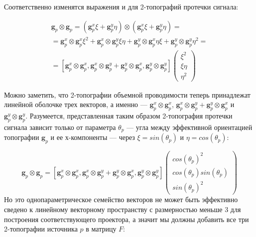 Соответственно изменятся выражения и для 2-топографий протечки сигнала:

\begin{gather}
    \mathbf{g}_p \otimes \mathbf{g}_p = (\mathbf{g}_p^x \xi
                                      + \mathbf{g}_p^y \eta) \otimes (\mathbf{g}_p^x \xi
                                      + \mathbf{g}_p^y \eta) = \nonumber \\
                                      = \mathbf{g}_p^x \otimes \mathbf{g}_p^x \xi^2
                                      + \mathbf{g}_p^x \otimes \mathbf{g}_p^y \xi \eta
                                      + \mathbf{g}_p^y\otimes  \mathbf{g}_p^x \eta \xi
                                      + \mathbf{g}_p^y \otimes \mathbf{g}_p^y \eta^2 = \nonumber \\
                                      = [\mathbf{g}_p^x \otimes \mathbf{g}_p^x,
                                         \mathbf{g}_p^x \otimes \mathbf{g}_p^y
                                      + \mathbf{g}_p^y \otimes \mathbf{g}_p^x,
                                        \mathbf{g}_p^y \otimes \mathbf{g}_p^y]
\left( \begin{array}{ccc}
\xi^2 \\
\xi \eta \\
\eta^2
\end{array}
\right)
\end{gather}

Можно заметить, что 2-топографии объемной проводимости теперь принадлежат линейной оболочке трех векторов,
а именно --- $\mathbf{g}_p^x \otimes \mathbf{g}_p^x$, $\mathbf{g}_p^x \otimes \mathbf{g}_p^y + \mathbf{g}_p^y \otimes \mathbf{g}_p^x$ и $\mathbf{g}_p^y \otimes \mathbf{g}_p^y$.
Разумеется, представленная таким образом 2-топография протечки сигнала зависит только от параметра $\theta_p$ --- угла
между эффективной ориентацией топографии $\mathbf{g}_p$ и ее $х$-компоненты --- через $\xi = sin(\theta_p)$ и $\eta=cos(\theta_p)$:

\begin{equation*}
    \mathbf{g}_p \otimes \mathbf{g}_p =[\mathbf{g}_p^x \otimes \mathbf{g}_p^x, \mathbf{g}_p^x \otimes \mathbf{g}_p^y + \mathbf{g}_p^y \otimes \mathbf{g}_p^x, \mathbf{g}_p^y \otimes \mathbf{g}_p^y]
    \left( \begin{array}{ccc}
    cos(\theta_p)^2 \\
    cos(\theta_p) sin(\theta_p) \\
    sin(\theta_p)^2
    \end{array}
    \right)
\end{equation*}
Но это однопараметрическое семейство векторов не может быть эффективно сведено к линейному векторному
пространству с размерностью меньше 3 для построения соответствующего проектора,
а значит мы должны добавить все три 2-топографии источника $p$ в матрицу $F$:

